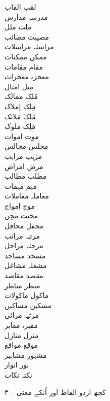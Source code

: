\documentclass[a4paper]{article}
\begin{document}
\begin{multicols}{3}
\begin{tabbing}
لقب \> القاب\\
مدرسہ \> مدارس\\
ملت \> ملل\\
مصیبت \> مصائب\\
مراسلہ \> مراسلات\\
ممکن \> ممکنات\\
مقام \> مقامات\\
معجزہ \> معجزات\\
مثل \> امثال\\
مُلک \> ممالک\\
مِلک \> اِملاک\\
مَلکَ \> مَلائک\\
مَلِک \> ملوک\\
موت \> اموات\\
مجلس \> مجالس\\
مزہب \> مزاہب\\
مرض \> امراض\\
مطلب \> مطالب\\
مہم \> مہمات\\
معاملہ \> معاملات\\
موج \> امواج\\
محنت \> محِن\\
محفل \> محافل\\
مرتبہ \> مراتب\\
مرحلہ \> مراحل\\
مسجد \> مساجد\\
مشغلہ \> مشاغل\\
مقصد \> مقاصد\\
منظر \> مناظر\\
ماکول \> ماکولات\\
مسکین \> مساکین\\
مرثیہ \> مراثی\\
مقبرہ \> مقابر\\
منزل \> منازل\\
موقع \> مواقع\\
مشہور \> مشاہیر\\
نور \> انوار\\
نکتہ \> نکات\\
\end{tabbing}
\end{multicols}
\clearpage
\begin{center}
{\fontsize{24pt}{18pt}\titlefont ۳ – کچھ اردو الفاظ اور اُنکے معنی}
\end{center}
\fontsize{12pt}{12pt}\linespread{1.2}\itfhindi
\newcommand{\seturdulabel}[1]{\item[\RLE{\notourdu #1}]\hfill\\}
\setLTR
\RTLmulticolcolumns
\begin{multicols}{3}
\begin{description}[listparindent=0pt,leftmargin=0pt]
%
{%
\seturdulabel{\word}
\meaning
}%
\end{description}
\end{multicols}
\end{document}
